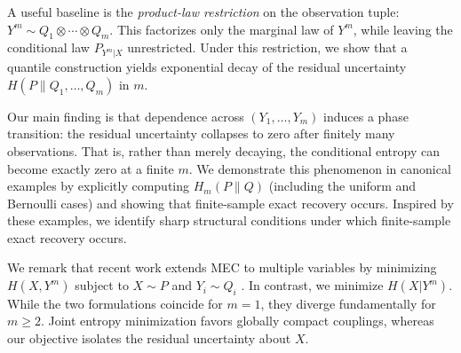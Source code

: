 \documentclass[journal]{IEEEtran}
\newcommand{\1}{\mathbf{1}}
\begin{document}
A useful baseline is the \textit{product-law restriction} on the observation tuple: \(Y^m\sim Q_1\otimes\cdots\otimes Q_m\). This factorizes only the
marginal law of \(Y^m\), while leaving the conditional law
\(P_{Y^m| X}\) unrestricted. Under this restriction, we show that a
quantile construction yields exponential decay of the residual uncertainty
\(H(P\|Q_1,\ldots,Q_m)\) in \(m\).


Our main finding is that dependence across $(Y_1,\dots,Y_m)$ induces a phase transition: the residual uncertainty collapses to zero after finitely many observations. That is, rather than merely decaying, the conditional entropy can become exactly zero at a finite $m$. We demonstrate this phenomenon in canonical examples by explicitly computing $H_m(P\|Q)$ (including the uniform and Bernoulli cases) and showing that finite-sample exact recovery occurs. Inspired by these examples, we identify sharp structural conditions under which finite-sample exact recovery occurs. 

We remark that recent work extends MEC to multiple variables by minimizing $H(X,Y^m)$ subject to $X\sim P$ and $Y_i\sim Q_i$ \cite{Cicalese_TIT,li2020efficient,EntropyCoupling_multi_compton2,EntropyCoupling_multi_compton}. In contrast, we minimize $H(X|Y^m)$. While the two formulations coincide for $m=1$, they diverge fundamentally for $m\ge2$. Joint entropy minimization favors globally compact couplings, whereas our objective isolates the residual uncertainty about $X$. 
\end{document}
